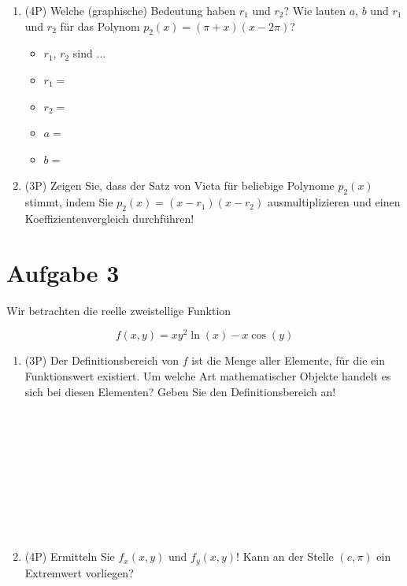 \documentclass[12pt]{article}
\begin{document}
\begin{enumerate}[label=(\alph*)]

\item (4P) Welche (graphische) Bedeutung haben $r_1$ und $r_2$? Wie lauten $a$, $b$ und $r_1$ und $r_2$ für das Polynom $p_2(x) = (\pi+x)(x-2\pi)$?

\begin{itemize}
\item $r_1$, $r_2$ sind ...
\item $r_1=$
\item $r_2=$
\item $a=$
\item $b=$
\end{itemize}

\item (3P) Zeigen Sie, dass der Satz von Vieta für beliebige Polynome $p_2(x)$ stimmt, indem Sie $p_2(x)=(x-r_1)(x-r_2)$ ausmultiplizieren
und einen Koeffizientenvergleich durchführen!

\end{enumerate}

\newpage
\section* {Aufgabe 3}

Wir betrachten die reelle zweistellige Funktion

$$f(x,y) = xy^2\ln(x)-x\cos(y)$$

\begin{enumerate}[label=(\alph*)]
\item (3P) Der Definitionsbereich von $f$ ist die Menge aller Elemente, für die ein Funktionswert existiert. Um welche Art mathematischer Objekte handelt es sich bei diesen Elementen? Geben Sie den Definitionsbereich an!
\\
\\
\\
\\
\\
\\
\\
\\
\\
\\
\item (4P) Ermitteln Sie $f_x(x,y)$ und $f_y(x,y)$! Kann an der Stelle $(e,\pi)$ ein Extremwert vorliegen?



\end{enumerate}
\end{document}
